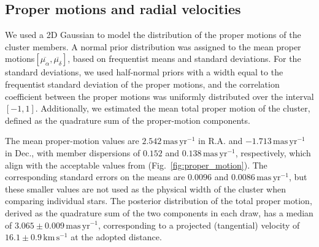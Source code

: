 \documentclass{aa}
\providecommand{\DIFaddtex}[1]{{\protect\color{red}\uwave{#1}}} %
\providecommand{\DIFaddbegin}{} %
\providecommand{\DIFaddend}{} %
\providecommand{\DIFadd}[1]{\texorpdfstring{\DIFaddtex{#1}}{#1}} %
\providecommand{\DIFaddincludegraphics}[2][]{{\color{blue}\fbox{\DIFOincludegraphics[#1]{#2}}}} %
\DeclareRobustCommand{\DIFaddbegin}{\DIFOaddbegin \let\includegraphics\DIFaddincludegraphics} %
\DeclareRobustCommand{\DIFaddend}{\DIFOaddend \let\includegraphics\DIFOincludegraphics} %
\begin{document}
\subsection{Proper motions and radial velocities}\label{subsec:pmrv}
We used a 2D Gaussian to model the distribution of the proper motions of the cluster members. A normal prior distribution was assigned to the mean proper motions\DIFaddbegin \DIFadd{, }\DIFaddend $\left[\overline{\mu_\alpha},\overline{\mu_\delta}\right]$, based on frequentist means and standard deviations. For the standard deviations, we used half-normal priors with a width equal to the frequentist standard deviation of the proper motions, and the correlation coefficient between the proper motions was uniformly distributed over the interval $[-1, 1]$. Additionally, we estimated the mean total proper motion of the cluster, defined as the quadrature sum of the proper-motion components.

The mean proper-motion values are $2.542\,\mathrm{mas\,yr^{-1}}$ in R.A. and $-1.713\,\mathrm{mas\,yr^{-1}}$ in Dec., with member dispersions of $0.152$ and $0.138\,\mathrm{mas\,yr^{-1}}$, respectively, which align with the acceptable values from \citet{2023MNRAS.526.4107P} (Fig.~\ref{fig:proper_motion}). The corresponding standard errors on the means are $0.0096$ and $0.0086\,\mathrm{mas\,yr^{-1}}$, but these smaller values are not used as the physical width of the cluster when comparing individual stars. The posterior distribution of the total proper motion, derived as the quadrature sum of the two components in each draw, has a median of $3.065 \pm 0.009\,\mathrm{mas\,yr^{-1}}$, corresponding to a projected (tangential) velocity of $16.1 \pm 0.9\,\mathrm{km\,s^{-1}}$ at the adopted distance.
\end{document}
